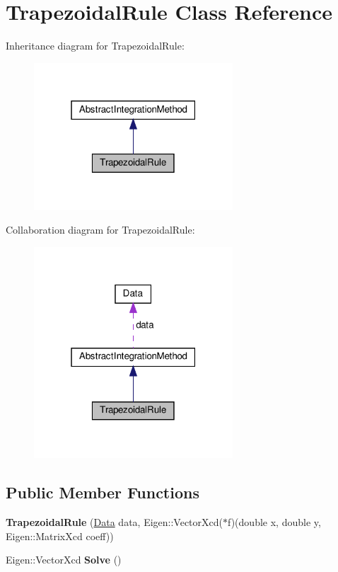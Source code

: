 \hypertarget{classTrapezoidalRule}{}\section{Trapezoidal\+Rule Class Reference}
\label{classTrapezoidalRule}


Inheritance diagram for Trapezoidal\+Rule\+:
\nopagebreak
\begin{figure}[H]
\begin{center}
\leavevmode
\includegraphics[width=211pt]{classTrapezoidalRule__inherit__graph}
\end{center}
\end{figure}


Collaboration diagram for Trapezoidal\+Rule\+:
\nopagebreak
\begin{figure}[H]
\begin{center}
\leavevmode
\includegraphics[width=211pt]{classTrapezoidalRule__coll__graph}
\end{center}
\end{figure}
\subsection*{Public Member Functions}
\begin{DoxyCompactItemize}
\item 
\mbox{\label{classTrapezoidalRule_ac366b3b5a8758ad00590f029c0b0bdd7}} 
{\bfseries Trapezoidal\+Rule} (\hyperlink{structData}{Data} data, Eigen\+::\+Vector\+Xcd($\ast$f)(double x, double y, Eigen\+::\+Matrix\+Xcd coeff))
\item 
\mbox{\label{classTrapezoidalRule_ae822d86948bdc8876bf524cd620e11b8}} 
Eigen\+::\+Vector\+Xcd {\bfseries Solve} ()
\end{DoxyCompactItemize}
